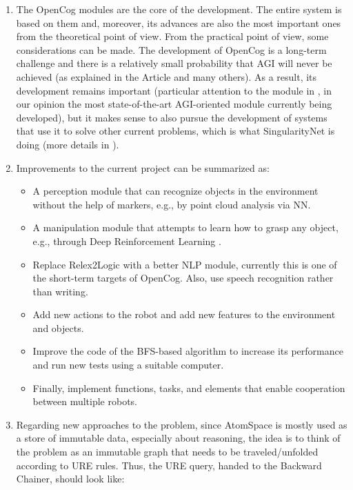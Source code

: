 \begin{enumerate}
	\item The OpenCog modules are the core of the development. The entire system is based on them and, moreover, its advances are also the most important ones from the theoretical point of view. From the practical point of view, some considerations can be made. The development of OpenCog is a long-term challenge and there is a relatively small probability that AGI will never be achieved (as explained in the Article \cite{hollander_2021} and many others). 
As a result, its development remains important (particular attention to the module in \cite{linas_learn}, in our opinion the most state-of-the-art AGI-oriented module currently being developed), but it makes sense to also pursue the development of systems that use it to solve other current problems, which is what SingularityNet is doing (more details in \cite{kolonin_2018}). 

	\item Improvements to the current project can be summarized as:

	\begin{itemize}
		\item A perception module that can recognize objects in the environment without the help of markers, e.g., by point cloud analysis via NN.

		\item A manipulation module that attempts to learn how to grasp any object, e.g., through Deep Reinforcement Learning \cite{DBLP:journals/corr/abs-2007-04499}.

		\item Replace Relex2Logic with a better NLP module, currently this is one of the short-term targets of OpenCog. Also, use speech recognition rather than writing.

		\item Add new actions to the robot and add new features to the environment and objects.

		\item Improve the code of the BFS-based algorithm to increase its performance and run new tests using a suitable computer.

		\item Finally, implement functions, tasks, and elements that enable cooperation between multiple robots.
	\end{itemize}

	\item Regarding new approaches to the problem, since AtomSpace is mostly used as a store of immutable data, especially about reasoning, the idea is to think of the problem as an immutable graph that needs to be traveled/unfolded according to URE rules. Thus, the URE query, handed to the Backward Chainer, should look like:


\end{enumerate}
